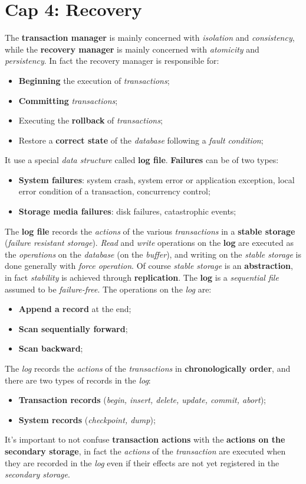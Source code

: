 \documentclass{article}
\begin{document}
\section{Cap 4: Recovery}
The \textbf{transaction manager} is mainly concerned with \emph{isolation} and \emph{consistency}, while the \textbf{recovery manager} is mainly concerned with \emph{atomicity} and \emph{persistency}. In fact the recovery manager is responsible for:
\begin{itemize}
\item \textbf{Beginning} the execution of \emph{transactions};
\item \textbf{Committing} \emph{transactions};
\item Executing the \textbf{rollback} of \emph{transactions};
\item Restore a \textbf{correct state }of the \emph{database} following a \emph{fault condition};
\end{itemize}
It use a special \emph{data structure} called \textbf{log file}. \textbf{Failures} can be of two types: 
\begin{itemize}
\item \textbf{System failures}: system crash, system error or application exception, local error condition of a transaction, concurrency control;
\item \textbf{Storage media failures}: disk failures, catastrophic events;
\end{itemize}
The \textbf{log file} records the \emph{actions} of the various \emph{transactions} in a \textbf{stable storage} (\emph{failure resistant storage}). \emph{Read} and \emph{write} operations on the \textbf{log} are executed as the \emph{operations} on the \emph{database} (on the \emph{buffer}), and writing on the \emph{stable storage} is done generally with \emph{force operation}. Of course \emph{stable storage} is an \textbf{abstraction}, in fact \emph{stability} is achieved through \textbf{replication}. The \textbf{log} is a \emph{sequential file }assumed to be \emph{failure-free}. The operations on the \emph{log} are:
\begin{itemize}
\item \textbf{Append a record} at the end;
\item \textbf{Scan sequentially forward};
\item \textbf{Scan backward};
\end{itemize}
The \emph{log} records the \emph{actions} of the \emph{transactions} in \textbf{chronologically order}, and there are two types of records in the \emph{log}:
\begin{itemize}
\item \textbf{Transaction records} (\emph{begin, insert, delete, update, commit, abort});
\item \textbf{System records} (\emph{checkpoint, dump}); 
\end{itemize} 
It's important to not confuse \textbf{transaction actions} with the \textbf{actions on the secondary storage}, in fact the \emph{actions} of the \emph{transaction} are executed when they are recorded in the \emph{log} even if their effects are not yet registered in the \emph{secondary storage}.
\end{document}
